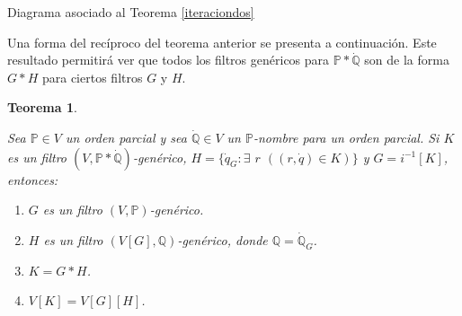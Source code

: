 \documentclass[11pt]{unam_tesis1}
\theoremstyle{MyThmStyle}
\theoremstyle{definition}
\theoremstyle{plain}
\newtheorem{theorem}[definition]{Teorema}
\theoremstyle{remark}
\begin{document}
\begin{center}

\centering

Diagrama asociado al Teorema \ref{iteraciondos}
\end{center}

Una forma del rec\'iproco del teorema anterior se presenta a continuaci\'on. Este resultado permitir\'a ver que todos los filtros gen\'ericos para $\mathbb P*\dot{\mathbb Q}$ son de la forma $G*H$ para ciertos filtros $G$ y $H$.

\begin{theorem}\label{iteracionuno}

Sea $\mathbb P\in V$ un orden parcial y sea $\dot {\mathbb Q}\in V$ un $\mathbb P$-nombre para un orden parcial. Si $K$ es un filtro $(V,\mathbb P*\dot {\mathbb Q})$-gen\'erico, $H=\{ \dot q_G: \exists$ $r$ $((r,\dot q)\in K)\}$ y $G=i^{-1}[K]$, entonces:

\begin{enumerate}
\item $G$ es un filtro $(V,\mathbb P)$-gen\'erico.
\item $H$ es un filtro $(V[G], \mathbb Q)$-gen\'erico, donde $\mathbb Q=\dot {\mathbb Q}_G$.
\item $K=G*H$. 
\item $V[K]=V[G][H]$.

\end{enumerate}
\end{theorem}
\end{document}

